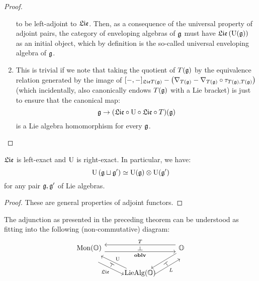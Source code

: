 \begin{proof}
\begin{enumerate}
                            to be left-adjoint to $\mathfrak{Lie}$. Then, as a consequence of the universal property of adjoint pairs, the category of enveloping algebras of $\mathfrak{g}$ must have $\mathfrak{Lie}\left(\mathrm{U}(\mathfrak{g})\right)$ as an initial object, which by definition is the so-called universal enveloping algebra of $\mathfrak{g}$.
                            \item This is trivial if we note that taking the quotient of $T(\mathfrak{g})$ by the equivalence relation generated by the image of $[-,-]_{\mathfrak{Lie} T(\mathfrak{g})} - \left(\nabla_{T(\mathfrak{g})} - \nabla_{T(\mathfrak{g})} \circ \tau_{T(\mathfrak{g}), T(\mathfrak{g})}\right)$ (which incidentally, also canonically endows $T(\mathfrak{g})$ with a Lie bracket) is just to ensure that the canonical map:
                                $$\mathfrak{g} \to (\mathfrak{Lie} \circ \mathrm{U} \circ \mathfrak{Lie} \circ T)(\mathfrak{g})$$
                            is a Lie algebra homomorphism for every $\mathfrak{g}$.
                        \end{enumerate}
                    \end{proof}
                \begin{corollary}
                    $\mathfrak{Lie}$ is left-exact and $\mathrm{U}$ is right-exact. In particular, we have:
                        $$\U\left(\g \sqcup \g'\right) \cong \U(\g) \tensor \U(\g')$$
                    for any pair $\mathfrak{g}, \mathfrak{g}'$ of Lie algebras. 
                \end{corollary}
                    \begin{proof}
                        These are general properties of adjoint functors.
                    \end{proof}
                \begin{remark}
                    The adjunction as presented in the preceding theorem can be understood as fitting into the following (non-commutative) diagram:
                        $$
                            \begin{tikzcd}
                            	{\Mon(\O)} & {} & {\O} \\
                            	& {\Lie\Alg(\O)}
                            	\arrow["{\oblv}"{name=0, swap}, from=1-1, to=1-3, shift right=2]
                            	\arrow["{T}"{name=1, swap}, from=1-3, to=1-1, shift right=2]
                            	\arrow["{L}"{name=2, swap}, from=2-2, to=1-3, shift right=5]
                            	\arrow[""{name=3, inner sep=0}, from=1-3, to=2-2, shift left=1]
                            	\arrow["{\U}"{name=4, swap}, from=2-2, to=1-1, shift left=1]
                            	\arrow["{\frakLie}"{name=5, swap}, from=1-1, to=2-2, shift right=5]
                            	\arrow["\dashv"{rotate=-90}, from=1, to=0, phantom]
                            	\arrow["\dashv"{rotate=61}, from=5, to=4, phantom]
                            	\arrow["\dashv"{rotate=129}, from=2, to=3, phantom]
                            \end{tikzcd}
                        $$
                \end{remark}
